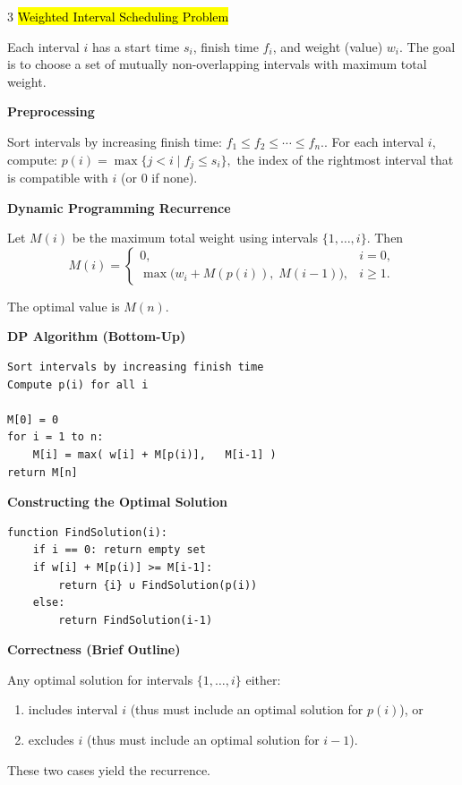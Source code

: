 \documentclass[letterpaper]{article}
\begin{document}
\begin{multicols*}{3}
    \hl{Weighted Interval Scheduling Problem}

    Each interval $i$ has a start time $s_i$, finish time $f_i$, and weight (value) $w_i$.
    The goal is to choose a set of mutually non-overlapping intervals with maximum total
    weight.

    \textbf{Preprocessing}

    Sort intervals by increasing finish time:
    $
        f_1 \le f_2 \le \cdots \le f_n.
    $.
    For each interval $i$, compute:
    $
        p(i) = \max \{ j < i \mid f_j \le s_i \},
    $
    the index of the rightmost interval that is compatible with $i$ (or $0$ if none).

    \textbf{Dynamic Programming Recurrence}

    Let $M(i)$ be the maximum total weight using intervals $\{1,\dots,i\}$.
    Then
    \[
        M(i) =
        \begin{cases}
            0,                                         & i = 0,   \\
            \max\bigl( w_i + M(p(i)),\; M(i-1) \bigr), & i \ge 1.
        \end{cases}
    \]

    The optimal value is $M(n)$.

    \textbf{DP Algorithm (Bottom-Up)}
    \begin{verbatim}
Sort intervals by increasing finish time
Compute p(i) for all i

M[0] = 0
for i = 1 to n:
    M[i] = max( w[i] + M[p(i)],   M[i-1] )
return M[n]
\end{verbatim}

    \textbf{Constructing the Optimal Solution}
    \begin{verbatim}
function FindSolution(i):
    if i == 0: return empty set
    if w[i] + M[p(i)] >= M[i-1]:
        return {i} ∪ FindSolution(p(i))
    else:
        return FindSolution(i-1)
\end{verbatim}

    \textbf{Correctness (Brief Outline)}

    Any optimal solution for intervals $\{1,\dots,i\}$ either:
    \begin{enumerate}
        \item includes interval $i$ (thus must include an optimal solution for $p(i)$), or
        \item excludes $i$ (thus must include an optimal solution for $i-1$).
    \end{enumerate}
    These two cases yield the recurrence.


\end{multicols*}
\end{document}
